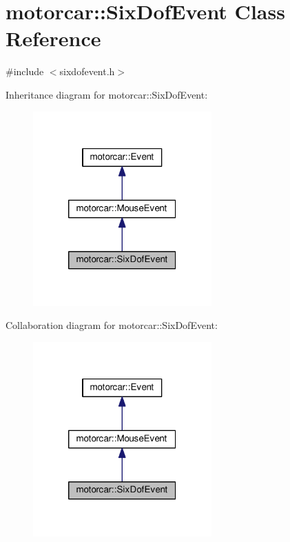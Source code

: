 \hypertarget{classmotorcar_1_1SixDofEvent}{\section{motorcar\-:\-:Six\-Dof\-Event Class Reference}
\label{classmotorcar_1_1SixDofEvent}
}


{\ttfamily \#include $<$sixdofevent.\-h$>$}



Inheritance diagram for motorcar\-:\-:Six\-Dof\-Event\-:
\nopagebreak
\begin{figure}[H]
\begin{center}
\leavevmode
\includegraphics[width=194pt]{classmotorcar_1_1SixDofEvent__inherit__graph}
\end{center}
\end{figure}


Collaboration diagram for motorcar\-:\-:Six\-Dof\-Event\-:
\nopagebreak
\begin{figure}[H]
\begin{center}
\leavevmode
\includegraphics[width=194pt]{classmotorcar_1_1SixDofEvent__coll__graph}
\end{center}
\end{figure}

